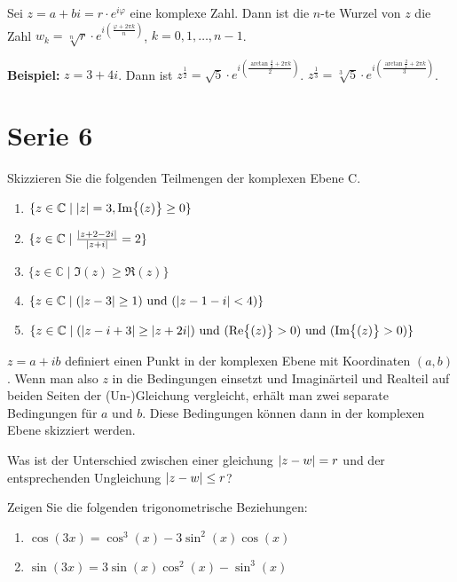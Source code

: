 \documentclass[12pt]{article}
\newcommand{\und}{\text{ und }}
\newcommand{\C}{\mathbb{C}}
\newenvironment{definition}[2][Definition]{\begin{trivlist}
        \item[\hskip \labelsep {\bfseries #1}\hskip \labelsep {\bfseries #2.}]}{\flushright{$\square$}\end{trivlist}}
\newenvironment{problem}[2][\textcolor{blue}{Tipps \& Tricks zu}]{\begin{trivlist}
        \item[\hskip \labelsep {\bfseries #1}\hskip \labelsep {\bfseries \textcolor{blue}{#2}.}]}{\end{trivlist}}
\newenvironment{question}[2][\textcolor{red}{Aufgabe}]{\begin{trivlist}
        \item[\hskip \labelsep {\bfseries \textcolor{red}{#1}}\hskip \labelsep {\bfseries \textcolor{red}{#2}.}]}{\end{trivlist}}
\begin{document}
\begin{definition}{[Wurzeln]}
        Sei $z=a+bi=r\cdot{e}^{i\varphi}$ eine komplexe Zahl. Dann ist die $n$-te Wurzel von $z$ die Zahl $w_k=\sqrt[n]{r}\cdot{e}^{i\left(\frac{\varphi+2\pi k}{n}\right)}$, $k=0,1,\ldots,n-1$.

        \textbf{Beispiel:} $z=3+4i$. Dann ist $z^{\frac{1}{2}}=\sqrt{5}\cdot{e}^{i\left(\frac{\arctan{\frac{4}{3}}+2\pi k}{2}\right)}$. $z^{\frac{1}{3}}=\sqrt[3]{5}\cdot{e}^{i\left(\frac{\arctan{\frac{2}{1}}+2\pi k}{3}\right)}$.
\end{definition}

\section{Serie 6}\label{sec:serie6}

\begin{question}{1}
        Skizzieren Sie die folgenden Teilmengen der komplexen Ebene C.
        \begin{enumerate}[label=(\alph*)]
                \item $\{z\in\C\mid\abs{z}= 3, \Im{(z)}\geq0\}$
                \item $\{z\in\C\mid\frac{\abs{z+2-2i}}{\abs{z+i}} = 2\}$
                \item $\{z\in\C\mid\Im{(z)}\geq\Re{(z)}\}$
                \item $\{z\in\C\mid (\abs{z - 3} \geq 1) \text{ und } (\abs{z - 1 - i} < 4)\}$
                \item $\{z\in\C\mid (\abs{z - i + 3} \geq \abs{z + 2i}) \und (\Re{(z)} > 0) \und (\Im{(z)} > 0)\}$
        \end{enumerate}
\end{question}

\begin{problem}{1}
$z=a+ib$ definiert einen Punkt in der komplexen Ebene mit Koordinaten $(a,b)$. Wenn man also $z$ in die Bedingungen einsetzt und Imaginärteil und Realteil auf beiden Seiten der (Un-)Gleichung vergleicht, erhält man zwei separate Bedingungen für $a$ und $b$. Diese Bedingungen können dann in der komplexen Ebene skizziert werden.

Was ist der Unterschied zwischen einer gleichung $\abs{z-w}=r$ und der entsprechenden Ungleichung $\abs{z-w}\leq{r}$? 
\end{problem}

\begin{question}{2}
        Zeigen Sie die folgenden trigonometrische Beziehungen:

        \begin{enumerate}[label=(\alph*)]
                \item $\cos(3x) = \cos^3(x) - 3\sin^2(x)\cos(x)$
                \item $\sin(3x) = 3\sin(x)\cos^2(x) - \sin^3(x)$
        \end{enumerate}
\end{question}
\end{document}
